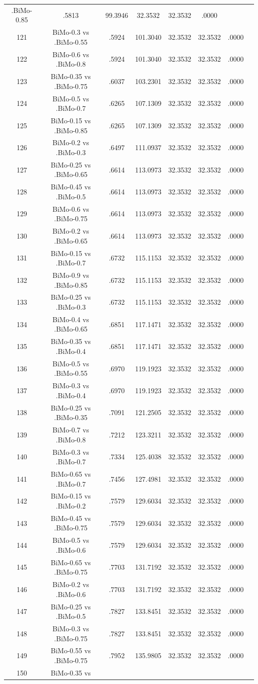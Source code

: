 \documentclass[a4paper,10pt]{article}
\begin{document}
\begin{landscape}
\begin{table}[!htp]
\begin{tabular}{cccccccc}
.BiMo-0.85&.5813&99.3946&32.3532&32.3532&.0000\\121&BiMo-0.3 vs .BiMo-0.55&.5924&101.3040&32.3532&32.3532&.0000\\122&BiMo-0.6 vs .BiMo-0.8&.5924&101.3040&32.3532&32.3532&.0000\\123&BiMo-0.35 vs .BiMo-0.75&.6037&103.2301&32.3532&32.3532&.0000\\124&BiMo-0.5 vs .BiMo-0.7&.6265&107.1309&32.3532&32.3532&.0000\\125&BiMo-0.15 vs .BiMo-0.85&.6265&107.1309&32.3532&32.3532&.0000\\126&BiMo-0.2 vs .BiMo-0.3&.6497&111.0937&32.3532&32.3532&.0000\\127&BiMo-0.25 vs .BiMo-0.65&.6614&113.0973&32.3532&32.3532&.0000\\128&BiMo-0.45 vs .BiMo-0.5&.6614&113.0973&32.3532&32.3532&.0000\\129&BiMo-0.6 vs .BiMo-0.75&.6614&113.0973&32.3532&32.3532&.0000\\130&BiMo-0.2 vs .BiMo-0.65&.6614&113.0973&32.3532&32.3532&.0000\\131&BiMo-0.15 vs .BiMo-0.7&.6732&115.1153&32.3532&32.3532&.0000\\132&BiMo-0.9 vs .BiMo-0.85&.6732&115.1153&32.3532&32.3532&.0000\\133&BiMo-0.25 vs .BiMo-0.3&.6732&115.1153&32.3532&32.3532&.0000\\134&BiMo-0.4 vs .BiMo-0.65&.6851&117.1471&32.3532&32.3532&.0000\\135&BiMo-0.35 vs .BiMo-0.4&.6851&117.1471&32.3532&32.3532&.0000\\136&BiMo-0.5 vs .BiMo-0.55&.6970&119.1923&32.3532&32.3532&.0000\\137&BiMo-0.3 vs .BiMo-0.4&.6970&119.1923&32.3532&32.3532&.0000\\138&BiMo-0.25 vs .BiMo-0.35&.7091&121.2505&32.3532&32.3532&.0000\\139&BiMo-0.7 vs .BiMo-0.8&.7212&123.3211&32.3532&32.3532&.0000\\140&BiMo-0.3 vs .BiMo-0.7&.7334&125.4038&32.3532&32.3532&.0000\\141&BiMo-0.65 vs .BiMo-0.7&.7456&127.4981&32.3532&32.3532&.0000\\142&BiMo-0.15 vs .BiMo-0.2&.7579&129.6034&32.3532&32.3532&.0000\\143&BiMo-0.45 vs .BiMo-0.75&.7579&129.6034&32.3532&32.3532&.0000\\144&BiMo-0.5 vs .BiMo-0.6&.7579&129.6034&32.3532&32.3532&.0000\\145&BiMo-0.65 vs .BiMo-0.75&.7703&131.7192&32.3532&32.3532&.0000\\146&BiMo-0.2 vs .BiMo-0.6&.7703&131.7192&32.3532&32.3532&.0000\\147&BiMo-0.25 vs .BiMo-0.5&.7827&133.8451&32.3532&32.3532&.0000\\148&BiMo-0.3 vs .BiMo-0.75&.7827&133.8451&32.3532&32.3532&.0000\\149&BiMo-0.55 vs .BiMo-0.75&.7952&135.9805&32.3532&32.3532&.0000\\150&BiMo-0.35 vs 
\end{tabular}
\end{table}
\end{landscape}
\end{document}
